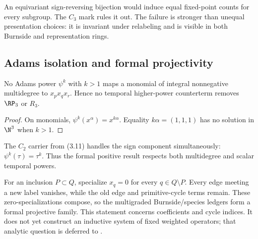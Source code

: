 An equivariant sign-reversing bijection would induce equal fixed-point counts
for every subgroup.  The $C_3$ mark rules it out.  The failure is stronger
than unequal presentation choices: it is invariant under relabeling and is
visible in both Burnside and representation rings.

\subsection{Adams isolation and formal projectivity}

\begin{proposition}
\label{prop:adams-isolation}
No Adams power $\psi^k$ with $k>1$ maps a monomial of integral nonnegative
multidegree to $x_px_qx_r$.  Hence no temporal higher-power counterterm
removes $\RP_3$ or $R_3$.
\end{proposition}

\begin{proof}
On monomials, $\psi^k(x^\alpha)=x^{k\alpha}$.  Equality
$k\alpha=(1,1,1)$ has no solution in $\N^3$ when $k>1$.
\end{proof}

The $C_2$ carrier from (3.11) handles the sign component simultaneously:
$\psi^k(\tau)=\tau^k$.  Thus the formal positive result respects both
multidegree and scalar temporal powers.

For an inclusion $P\subset Q$, specialize $x_q=0$ for every
$q\in Q\setminus P$.  Every edge meeting a new label vanishes, while the old
edge and primitive-cycle terms remain.  These zero-specializations compose,
so the multigraded Burnside/species ledgers form a formal projective family.
This statement concerns coefficients and cycle indices.  It does not yet
construct an inductive system of fixed weighted operators; that analytic
question is deferred to .
